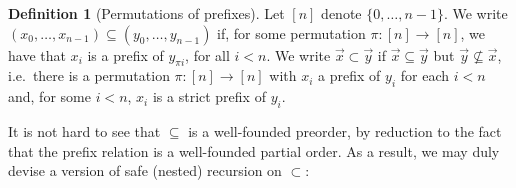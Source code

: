 \documentclass[manuscript,screen]{acmart}
\theoremstyle{definition}
\newtheorem{defn}[thm]{Definition}
\theoremstyle{remark}
\newcommand{\permpref}{\subset}
\newcommand{\permprefeq}{\subseteq}
\begin{document}
\begin{defn}
[Permutations of prefixes]
\label{defn:perm-pref}
Let $[n]$ denote $\{0,\dots, n-1\}$.
We write $(x_0, \dots, x_{n-1}) \permprefeq (y_0, \dots, y_{n-1})$ if, for some permutation $\pi:[n] \to [n] $, we have that $x_i$ is a prefix of $y_{\pi i}$, for all $i<n$.
We write $\vec x \permpref \vec y$ if $\vec x \permprefeq \vec{y} $ but $ \vec y \not\permprefeq \vec{x}$, i.e.\ there is a permutation $\pi : [n]\to [n]$ with $x_i$ a prefix of $y_i$ for each $i<n$ and, for some $i<n$, $x_i$ is a strict prefix of $y_i$.
\end{defn}

It is not hard to see that $\permprefeq$ is a well-founded preorder, by reduction to the fact that the prefix relation is a well-founded partial order.
As a result, we may duly devise a version of safe (nested) recursion on $\permpref$:
\end{document}
